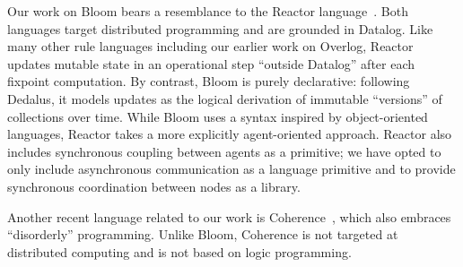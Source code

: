 Our work on Bloom bears a resemblance to the Reactor
language~\cite{reactors}. Both languages target distributed programming and are
grounded in Datalog. 
Like many other rule languages including our earlier work on Overlog, Reactor updates mutable state in an operational step ``outside Datalog'' after each fixpoint computation.  By contrast, Bloom is purely declarative: following Dedalus, it models updates as the logical derivation of immutable ``versions'' of collections over time.   While Bloom uses a syntax inspired by
object-oriented languages, Reactor takes a more explicitly agent-oriented
approach. Reactor also includes synchronous coupling between agents as a
primitive; we have opted to only include asynchronous communication as a
language primitive and to provide synchronous coordination between nodes as a
library. 

Another recent language related to our work is Coherence~\cite{coherence}, which
also embraces ``disorderly'' programming. Unlike Bloom, Coherence is not
targeted at distributed computing and is not based on logic programming.